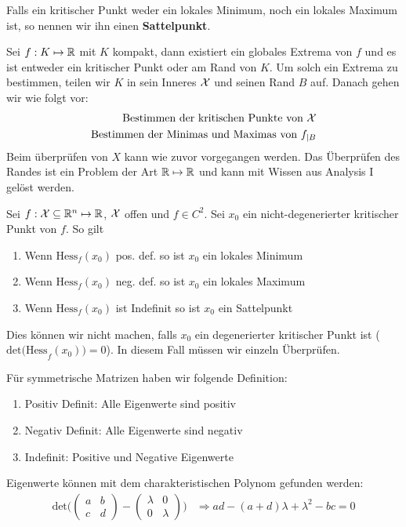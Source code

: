 Falls ein kritischer Punkt weder ein lokales Minimum, noch ein lokales Maximum ist, so nennen wir ihn einen
\textbf{Sattelpunkt}.



Sei $f: K \mapsto \mathbb{R}$ mit $K$ kompakt, dann existiert ein globales Extrema von $f$ und es ist entweder ein kritischer Punkt 
oder am Rand von $K$. Um solch ein Extrema zu bestimmen, teilen wir $K$ in sein Inneres $\mathcal{X}$ und seinen Rand $B$ auf. 
Danach gehen wir wie folgt vor:
\begin{align}
  \text{Bestimmen der kritischen Punkte von } \mathcal{X} \\
  \text{Bestimmen der Minimas und Maximas von } f_{|B}
\end{align}
Beim überprüfen von $X$ kann wie zuvor vorgegangen werden. Das Überprüfen des Randes ist ein Problem der Art $\mathbb{R} \mapsto \mathbb{R}$ 
und kann mit Wissen aus Analysis I gelöst werden.



Sei $f:\mathcal{X} \subseteq \mathbb{R}^n \mapsto \mathbb{R}$, $\mathcal{X}$ offen und $f \in C^2$. Sei $x_0$ ein nicht-degenerierter
kritischer Punkt von $f$. So gilt
\begin{enumerate}[label=(\arabic*)]
  \item Wenn $\text{Hess}_f(x_0)$ pos. def. so ist $x_0$ ein lokales Minimum
  \item Wenn $\text{Hess}_f(x_0)$ neg. def. so ist $x_0$ ein lokales Maximum
  \item Wenn $\text{Hess}_f(x_0)$ ist Indefinit so ist $x_0$ ein Sattelpunkt
\end{enumerate}
Dies können wir nicht machen, falls $x_0$ ein degenerierter kritischer Punkt ist ($\text{det(Hess}_f(x_0)) 
= 0$). In diesem Fall müssen wir einzeln Überprüfen.



Für symmetrische Matrizen haben wir folgende Definition:
\begin{enumerate}[label=(\arabic*)]
  \item Positiv Definit: Alle Eigenwerte sind positiv
  \item Negativ Definit: Alle Eigenwerte sind negativ
  \item Indefinit: Positive und Negative Eigenwerte
\end{enumerate}
Eigenwerte können mit dem charakteristischen Polynom gefunden werden:
\begin{align*}
  \text{det} \Bigg(
  \begin{pmatrix}
    a & b\\
    c & d
  \end{pmatrix}
  -
  \begin{pmatrix}
    \lambda & 0\\
    0 & \lambda
  \end{pmatrix}
  \Bigg)
  &\Rightarrow ad - (a + d) \lambda + \lambda^2 - bc = 0
\end{align*}

